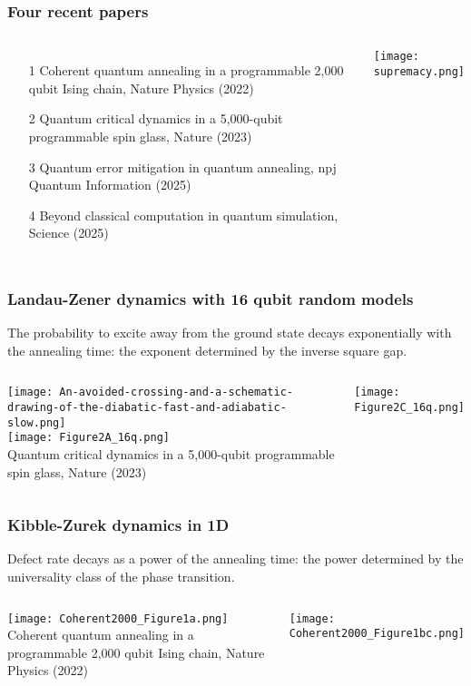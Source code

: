 \documentclass[aspectratio=169,final,11pt,forpublic]{beamer} %
\begin{document}
\begin{frame}\frametitle{\bf Four recent papers}
  \begin{columns}
    \vspace{-0.2cm}
  \begin{itemize}
    \item[1] Coherent quantum annealing in
      a programmable 2,000 qubit Ising chain, Nature
      Physics (2022)
    \item[2] Quantum critical dynamics in
      a 5,000-qubit programmable spin glass, Nature
      (2023)
    \item[3] Quantum error mitigation in quantum annealing, npj Quantum Information (2025)
    \item[4] Beyond classical computation in quantum simulation, Science (2025)
  \end{itemize}
  \texttt{[image: supremacy.png]}
\end{columns}
\end{frame}


\begin{frame}\frametitle{\bf Landau-Zener dynamics with 16 qubit random models}
  The probability to excite away from the ground state decays exponentially with the annealing time: the exponent determined by the inverse square gap. 
  \begin{columns}
    \begin{center}
    \texttt{[image: An-avoided-crossing-and-a-schematic-drawing-of-the-diabatic-fast-and-adiabatic-slow.png]}\\
    \texttt{[image: Figure2A\_16q.png]}\\
    {\small Quantum critical dynamics in
      a 5,000-qubit programmable spin glass, Nature
      (2023)}
    \end{center}
    \texttt{[image: Figure2C\_16q.png]}
    \end{columns}
\end{frame}

\begin{frame}\frametitle{\bf Kibble-Zurek dynamics in 1D}
  Defect rate decays as a power of the annealing time: the power determined by the universality class of the phase transition.
  \begin{columns}
    \begin{center}
      \texttt{[image: Coherent2000\_Figure1a.png]}\\
      {\small Coherent quantum annealing in
      a programmable 2,000 qubit Ising chain, Nature
      Physics (2022)}
    \end{center}
    \begin{center}
      \texttt{[image: Coherent2000\_Figure1bc.png]}\\
    \end{center}
\end{columns}
\end{frame}
\end{document}
